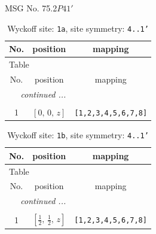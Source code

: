 \documentclass[fleqn,8pt]{jsarticle}
\begin{document}
\setcounter{MaxMatrixCols}{32}

\renewcommand{\tablename}{Table~}
\renewcommand{\figurename}{Figure~}
\begin{center}
\LARGE
MSG No. 75.2\quad$P41'$
\end{center}
\renewcommand{\arraystretch}{1.2}
\begin{longtable}{ccc}
\caption{Wyckoff site: {\tt 1a}, site symmetry: {\tt 4..1'}}
 \\
 \hline \hline
No. & position & mapping \\ \hline \endfirsthead

\multicolumn{2}{l}{\tablename\ \thetable{}} \\
 \hline \hline
No. & position & mapping \\ \hline \endhead

 \hline \hline
\multicolumn{2}{r}{\footnotesize\it continued ...} \\ \endfoot

 \hline \hline
\multicolumn{2}{r}{} \\ \endlastfoot

1 & $\left[ 0,\, 0,\, z \right]$ & {\tt [1,2,3,4,5,6,7,8]} \\
\end{longtable}
\renewcommand{\arraystretch}{1.2}
\begin{longtable}{ccc}
\caption{Wyckoff site: {\tt 1b}, site symmetry: {\tt 4..1'}}
 \\
 \hline \hline
No. & position & mapping \\ \hline \endfirsthead

\multicolumn{2}{l}{\tablename\ \thetable{}} \\
 \hline \hline
No. & position & mapping \\ \hline \endhead

 \hline \hline
\multicolumn{2}{r}{\footnotesize\it continued ...} \\ \endfoot

 \hline \hline
\multicolumn{2}{r}{} \\ \endlastfoot

1 & $\left[ \frac{1}{2},\, \frac{1}{2},\, z \right]$ & {\tt [1,2,3,4,5,6,7,8]} \\
\end{longtable}
\renewcommand{\arraystretch}{1.2}
\end{document}
